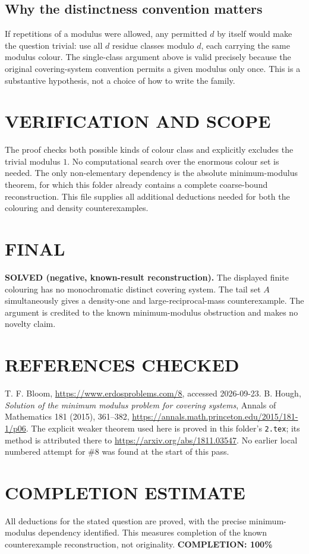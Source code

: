 \subsection{Why the distinctness convention matters}
If repetitions of a modulus were allowed, any permitted $d$ by itself would make the question trivial: use all $d$ residue classes modulo $d$, each carrying the same modulus colour. The single-class argument above is valid precisely because the original covering-system convention permits a given modulus only once. This is a substantive hypothesis, not a choice of how to write the family.

\section{VERIFICATION AND SCOPE}
The proof checks both possible kinds of colour class and explicitly excludes the trivial modulus $1$. No computational search over the enormous colour set is needed. The only non-elementary dependency is the absolute minimum-modulus theorem, for which this folder already contains a complete coarse-bound reconstruction. This file supplies all additional deductions needed for both the colouring and density counterexamples.

\section{FINAL}
\textbf{SOLVED (negative, known-result reconstruction).} The displayed finite colouring has no monochromatic distinct covering system. The tail set $A$ simultaneously gives a density-one and large-reciprocal-mass counterexample. The argument is credited to the known minimum-modulus obstruction and makes no novelty claim.

\section{REFERENCES CHECKED}
T. F. Bloom, \url{https://www.erdosproblems.com/8}, accessed 2026-09-23. B. Hough, \emph{Solution of the minimum modulus problem for covering systems}, Annals of Mathematics 181 (2015), 361--382, \url{https://annals.math.princeton.edu/2015/181-1/p06}. The explicit weaker theorem used here is proved in this folder's \texttt{2.tex}; its method is attributed there to \url{https://arxiv.org/abs/1811.03547}. No earlier local numbered attempt for \#8 was found at the start of this pass.

\section{COMPLETION ESTIMATE}
All deductions for the stated question are proved, with the precise minimum-modulus dependency identified. This measures completion of the known counterexample reconstruction, not originality.
\textbf{COMPLETION: 100\%}

